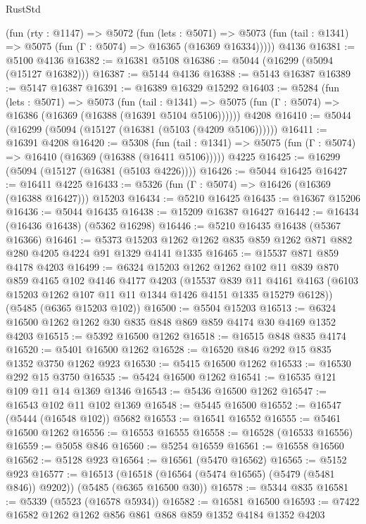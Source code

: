 \begin{lexlean}{RustStd}
\begin{coremodule}
    (fun (rty : @1147) =>
    @5072
      (fun (lets : @5071) =>
      @5073 (fun (tail : @1341) => @5075 (fun (Γ : @5074) => @16365 (@16369 @16334)))))
    @4136
@16381 := @5100 @4136
@16382 := @16381 @5108
@16386 := @5044 (@16299 (@5094 (@15127 @16382)))
@16387 := @5144 @4136
@16388 := @5143 @16387
@16389 := @5147 @16387
@16391 := @16389 @16329 @15292
@16403 := @5284
    (fun (lets : @5071) =>
    @5073
      (fun (tail : @1341) =>
      @5075 (fun (Γ : @5074) => @16386 (@16369 (@16388 (@16391 @5104 @5106))))))
    @4208
@16410 := @5044 (@16299 (@5094 (@15127 (@16381 (@5103 (@4209 @5106))))))
@16411 := @16391 @4208
@16420 := @5308
    (fun (tail : @1341) => @5075 (fun (Γ : @5074) => @16410 (@16369 (@16388 (@16411 @5106)))))
    @4225
@16425 := @16299 (@5094 (@15127 (@16381 (@5103 @4226))))
@16426 := @5044 @16425
@16427 := @16411 @4225
@16433 := @5326 (fun (Γ : @5074) => @16426 (@16369 (@16388 @16427))) @15203
@16434 := @5210 @16425
@16435 := @16367 @15206
@16436 := @5044 @16435
@16438 := @15209 @16387 @16427
@16442 := @16434 (@16436 @16438) (@5362 @16298)
@16446 := @5210 @16435 @16438 (@5367 @16366)
@16461 := @5373 @15203 @1262 @1262 @835 @859 @1262 @871 @882 @280 @4205 @4224 @91 @1329 @4141 @1335
@16465 := @15537 @871 @859 @4178 @4203
@16499 := @6324
    @15203
    @1262
    @1262
    @102
    @11
    @839
    @870
    @859
    @4165
    @102
    @4146
    @4177
    @4203
    (@15537
      @839
      @11
      @4161
      @4163
      (@6103 @15203 @1262 @107 @11 @11 @1344 @1426 @4151 @1335 @15279 @6128))
    (@5485 (@6365 @15203 @102))
@16500 := @5504 @15203
@16513 := @6324 @16500 @1262 @1262 @30 @835 @848 @869 @859 @4174 @30 @4169 @1352 @4203
@16515 := @5392 @16500 @1262
@16518 := @16515 @848 @835 @4174
@16520 := @5401 @16500 @1262
@16528 := @16520 @846 @292 @15 @835 @1352 @3750 @1262 @923
@16530 := @5415 @16500 @1262
@16533 := @16530 @292 @15 @3750
@16535 := @5424 @16500 @1262
@16541 := @16535 @121 @109 @11 @14 @1369 @1346
@16543 := @5436 @16500 @1262
@16547 := @16543 @102 @11 @102 @1369
@16548 := @5445 @16500
@16552 := @16547 (@5444 (@16548 @102)) @5682
@16553 := @16541 @16552
@16555 := @5461 @16500 @1262
@16556 := @16553 @16555
@16558 := @16528 (@16533 @16556)
@16559 := @5058 @846
@16560 := @5254 @16559
@16561 := @16558 @16560
@16562 := @5128 @923
@16564 := @16561 (@5470 @16562)
@16565 := @5152 @923
@16577 := @16513
    (@16518 (@16564 (@5474 @16565) (@5479 (@5481 @846)) @9202))
    (@5485 (@6365 @16500 @30))
@16578 := @5344 @835
@16581 := @5339 (@5523 (@16578 @5934))
@16582 := @16581 @16500
@16593 := @7422 @16582 @1262 @1262 @856 @861 @868 @859 @1352 @4184 @1352 @4203

\end{coremodule}
\end{lexlean}
